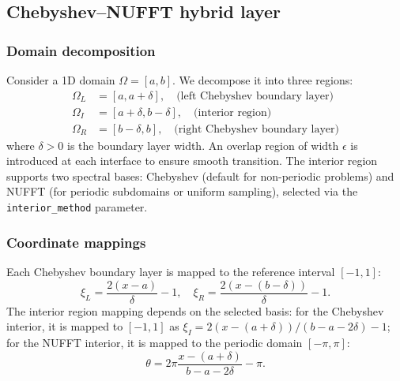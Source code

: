 \documentclass[sn-mathphys,Numbered]{sn-jnl}
\theoremstyle{thmstyleone}
\theoremstyle{thmstyletwo}
\theoremstyle{thmstylethree}
\begin{document}
\subsection{Chebyshev--NUFFT hybrid layer}\label{subsec:hybrid}

\subsubsection{Domain decomposition}
Consider a 1D domain $\Omega = [a, b]$. We decompose it into three regions:
\begin{align}
    \Omega_L &= [a, a+\delta], \quad \text{(left Chebyshev boundary layer)} \\
    \Omega_I &= [a+\delta, b-\delta], \quad \text{(interior region)} \\
    \Omega_R &= [b-\delta, b], \quad \text{(right Chebyshev boundary layer)}
\end{align}
where $\delta > 0$ is the boundary layer width. An overlap region of width $\epsilon$ is introduced at each interface to ensure smooth transition. The interior region supports two spectral bases: Chebyshev (default for non-periodic problems) and NUFFT (for periodic subdomains or uniform sampling), selected via the \texttt{interior\_method} parameter.

\subsubsection{Coordinate mappings}
Each Chebyshev boundary layer is mapped to the reference interval $[-1, 1]$:
\begin{equation}
    \xi_L = \frac{2(x - a)}{\delta} - 1, \quad \xi_R = \frac{2(x - (b-\delta))}{\delta} - 1.
\end{equation}
The interior region mapping depends on the selected basis: for the Chebyshev interior, it is mapped to $[-1, 1]$ as $\xi_I = 2(x-(a+\delta))/(b-a-2\delta)-1$; for the NUFFT interior, it is mapped to the periodic domain $[-\pi, \pi]$:
\begin{equation}
    \theta = 2\pi \frac{x - (a+\delta)}{b - a - 2\delta} - \pi.
\end{equation}
\end{document}
